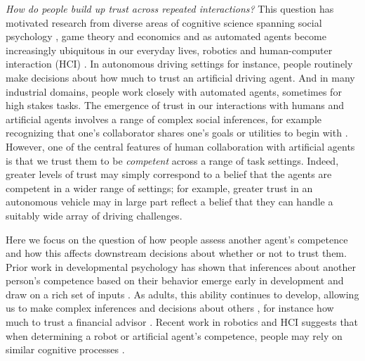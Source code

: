 \documentclass[10pt,letterpaper]{article}
\begin{document}
\textit{How do people build up trust across repeated interactions?} This question has motivated research from diverse areas of cognitive science spanning social psychology \cite{simpson2007psychological, deutsch1973resolution}, game theory and economics \cite{camerer1988experimental, berg1995trust} and as automated agents become increasingly ubiquitous in our everyday lives, robotics and human-computer interaction (HCI) \cite{soh2020multi, chen2020trust}. 
In autonomous driving settings for instance, people routinely make decisions about how much to trust an artificial driving agent. And in many industrial domains, people work closely with automated agents, sometimes for high stakes tasks. The emergence of trust in our interactions with humans and artificial agents involves a range of complex social inferences, for example recognizing that one's collaborator shares one's goals or utilities to begin with \cite{serrino2019finding}. However, one of the central features of human collaboration with artificial agents is that we trust them to be \textit{competent} across a range of task settings. Indeed, greater levels of trust may simply correspond to a belief that the agents are competent in a wider range of settings; for example, greater trust in an autonomous vehicle may in large part reflect a belief that they can handle a suitably wide array of driving challenges.

Here we focus on the question of how people assess another agent's competence and how this affects downstream decisions about whether or not to trust them. Prior work in developmental psychology has shown that inferences about another person's competence based on their behavior emerge early in development and draw on a rich set of inputs \cite{gweon2021inferential, leonard2019better}. As adults, this ability continues to develop, allowing us to make complex inferences and decisions about others \cite{velez2019integrating, velez2021learning}, for instance how much to trust a financial advisor \cite{leong2018unrealistic}. Recent work in robotics and HCI suggests that when determining a robot or artificial agent's competence, people may rely on similar cognitive processes \cite{soh2020multi, xie2019robot}. 
\end{document}
